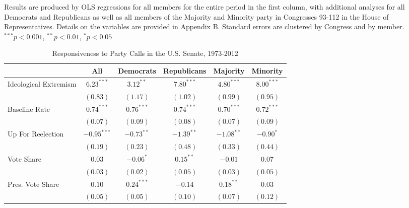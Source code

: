 \documentclass[12pt]{article}
\begin{document}
\begin{table}[H]
\begin{threeparttable}
\begin{tablenotes}
   \item
   Results are produced by OLS regressions for all members for the entire period
   in the first column, with additional analyses for all Democrats and
   Republicans as well as all members of the Majority and Minority party in
   Congresses 93-112 in the House of Representatives.
   Details on the variables are provided in Appendix B.
   Standard errors are clustered by Congress and by member.
$^{***}p<0.001$, $^{**}p<0.01$, $^*p<0.05$
 \end{tablenotes}
\end{threeparttable}
\end{table}

\begin{table}[H]
\centering
\begin{threeparttable}
\singlespacing
\small
\caption{Responsiveness to Party Calls in the U.S. Senate, 1973-2012}
\label{tab-senate-models}
\small
\begin{tabular}{l c c c c c }
\hline
& All & Democrats & Republicans & Majority & Minority \\
\hline
Ideological Extremism & $6.23^{***}$  & $3.12^{**}$  & $7.80^{***}$   & $4.80^{***}$ & $8.00^{***}$ \\
                      & $(0.83)$      & $(1.17)$     & $(1.02)$       & $(0.99)$     & $(0.95)$     \\
Baseline Rate         & $0.74^{***}$  & $0.76^{***}$ & $0.74^{***}$   & $0.70^{***}$ & $0.72^{***}$ \\
                      & $(0.07)$      & $(0.09)$     & $(0.08)$       & $(0.07)$     & $(0.09)$     \\
Up For Reelection     & $-0.95^{***}$ & $-0.73^{**}$ & $-1.39^{**}$   & $-1.08^{**}$ & $-0.90^{*}$  \\
                      & $(0.19)$      & $(0.23)$     & $(0.48)$       & $(0.33)$     & $(0.44)$     \\
Vote Share            & $0.03$        & $-0.06^{*}$  & $0.15^{**}$    & $-0.01$      & $0.07$       \\
                      & $(0.03)$      & $(0.02)$     & $(0.05)$       & $(0.03)$     & $(0.05)$     \\
Pres. Vote Share      & $0.10$        & $0.24^{***}$ & $-0.14$        & $0.18^{**}$  & $0.03$       \\
                      & $(0.05)$      & $(0.05)$     & $(0.10)$       & $(0.07)$     & $(0.12)$     \\

\end{tabular}
\end{threeparttable}
\end{table}
\end{document}
